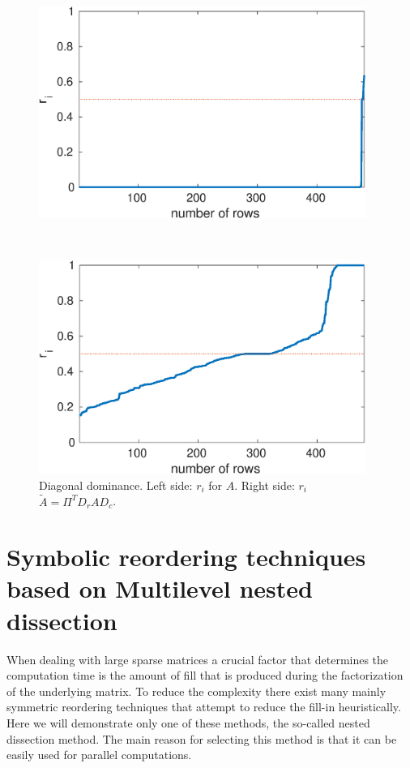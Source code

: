 \begin{figure}
\begin{minipage}{.48\textwidth}
 \begin{center}
%
\includegraphics[width=0.95\textwidth,height=0.5\textwidth]{figures/west0479-dd} 
 \end{center}
\end{minipage}
~
\begin{minipage}{.48\textwidth}
  \begin{center}
%
\includegraphics[width=0.95\textwidth,height=0.5\textwidth]{figures/west0479-match-dd} 
 \end{center}  
\end{minipage}
    \caption{Diagonal dominance. Left side: $r_i$ for $A$. Right side: $r_i$  $\tilde A=\Pi^TD_rAD_c$.}
    \label{fig:mwm-dd}
\end{figure}

\section[Symbolic reordering techniques based on nested dissection]{Symbolic reordering techniques based on Multilevel nested dissection} 
\label{sec:reordering}
When dealing with large sparse matrices a crucial factor that determines
the computation time is the amount of fill that is produced during the
factorization of the underlying matrix. To reduce the complexity there
exist many mainly symmetric reordering techniques that attempt to reduce
the fill-in heuristically. Here we will demonstrate only one of these
methods, the so-called nested dissection method. The main reason for selecting
this method is that it can be easily used for parallel computations.

